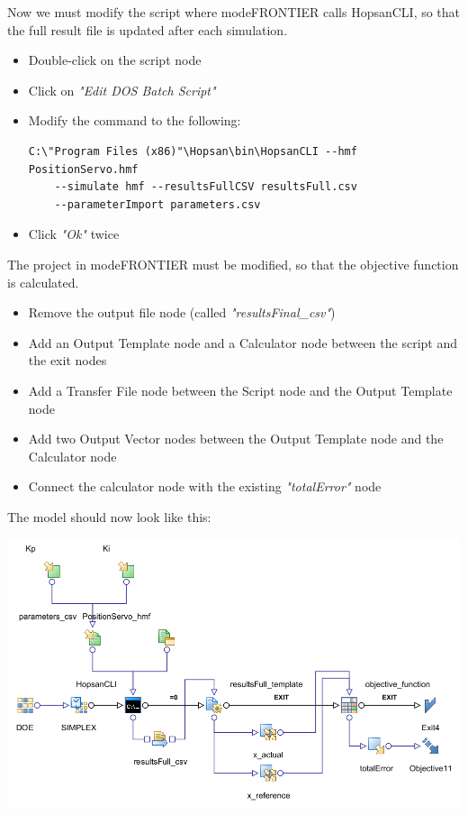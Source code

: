 \documentclass[a4paper]{article}
\begin{document}
\begin{tutenumerate}
\begin{enumerate}
Now we must modify the script where modeFRONTIER calls HopsanCLI, so that the full result file is updated after each simulation.
\begin{itemize}
\item Double-click on the script node


\item Click on \textit{"Edit DOS Batch Script"}
\item Modify the command to the following:
\begin{lstlisting}[basicstyle=\footnotesize\ttfamily, breaklines=true]
C:\"Program Files (x86)"\Hopsan\bin\HopsanCLI --hmf PositionServo.hmf
    --simulate hmf --resultsFullCSV resultsFull.csv 
    --parameterImport parameters.csv
\end{lstlisting}
\item Click \textit{"Ok"} twice
\end{itemize}

The project in modeFRONTIER must be modified, so that the objective function is calculated. 
\begin{itemize}
\item Remove the output file node (called \textit{"resultsFinal\_csv"})
\item Add an Output Template node and a Calculator node between the script and the exit nodes
\item Add a Transfer File node between the Script node and the Output Template node
\item Add two Output Vector nodes between the Output Template node and the Calculator node
\item Connect the calculator node with the existing \textit{"totalError"} node
\end{itemize}

The model should now look like this:

\begin{center}
\includegraphics[scale=0.56]{gfx/modefrontier/model_full.png}
\end{center}



\end{enumerate}
\end{tutenumerate}
\end{document}
